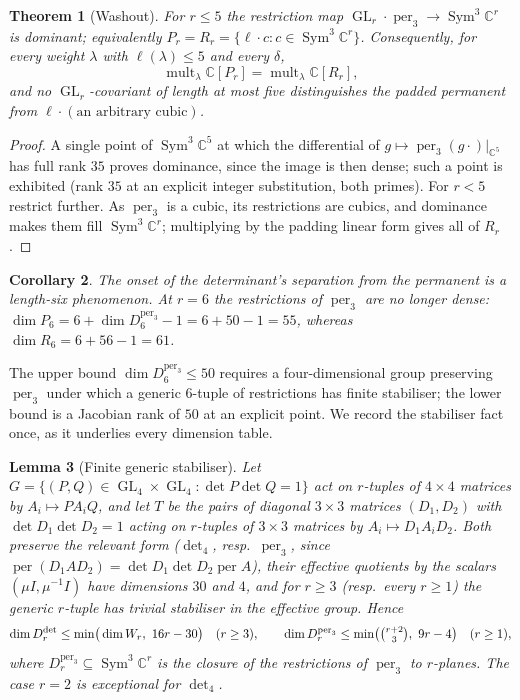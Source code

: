 \documentclass[11pt]{amsart}
\theoremstyle{plain}
\newtheorem{theorem}{Theorem}[section]
\newtheorem{lemma}[theorem]{Lemma}
\newtheorem{corollary}[theorem]{Corollary}
\theoremstyle{definition}
\theoremstyle{remark}
\DeclareMathOperator{\GL}{GL}
\DeclareMathOperator{\Sym}{Sym}
\DeclareMathOperator{\mult}{mult}
\DeclareMathOperator{\per}{per}
\newcommand{\bC}{\mathbb{C}}
\newcommand{\Rr}{R}
\newcommand{\Pp}{P}
\newcommand{\Ddet}{D^{\det}}
\begin{document}
\begin{theorem}[Washout]\label{thm:washout}
For $r\le5$ the restriction map $\GL_r\cdot\per_3\to\Sym^{3}\bC^{r}$ is
dominant; equivalently $\Pp_r=\Rr_r=\{\ell\cdot c:c\in\Sym^{3}\bC^{r}\}$.
Consequently, for every weight $\lambda$ with $\ell(\lambda)\le5$ and every
$\delta$,
\[
  \mult_\lambda\bC[\Pp_r]=\mult_\lambda\bC[\Rr_r],
\]
and no $\GL_r$-covariant of length at most five distinguishes the padded
permanent from $\ell\cdot(\text{an arbitrary cubic})$.
\end{theorem}

\begin{proof}
A single point of $\Sym^{3}\bC^{5}$ at which the differential of
$g\mapsto\per_3(g\cdot)|_{\bC^{5}}$ has full rank $35$ proves dominance, since
the image is then dense; such a point is exhibited (rank $35$ at an explicit
integer substitution, both primes).  For $r<5$ restrict further.  As
$\per_3$ is a cubic, its restrictions are cubics, and dominance makes them fill
$\Sym^{3}\bC^{r}$; multiplying by the padding linear form gives all of
$\Rr_r$.
\end{proof}

\begin{corollary}\label{cor:washout}
The onset of the determinant's separation from the permanent is a
\emph{length-six} phenomenon.  At $r=6$ the restrictions of $\per_3$ are no
longer dense: $\dim\Pp_6=6+\dim D^{\per_3}_6-1=6+50-1=55$, whereas
$\dim\Rr_6=6+56-1=61$.
\end{corollary}

The upper bound $\dim D^{\per_3}_6\le50$ requires a four-dimensional group
preserving $\per_3$ under which a generic $6$-tuple of restrictions has finite
stabiliser; the lower bound is a Jacobian rank of $50$ at an explicit point.
We record the stabiliser fact once, as it underlies every dimension table.

\begin{lemma}[Finite generic stabiliser]\label{lem:finstab}
Let $G=\{(P,Q)\in\GL_4\times\GL_4:\det P\det Q=1\}$ act on $r$-tuples of
$4\times4$ matrices by $A_i\mapsto PA_iQ$, and let $T$ be the pairs of diagonal
$3\times3$ matrices $(D_1,D_2)$ with $\det D_1\det D_2=1$ acting on $r$-tuples
of $3\times3$ matrices by $A_i\mapsto D_1A_iD_2$.  Both preserve the relevant form
($\det_4$, resp.\ $\per_3$, since $\per(D_1AD_2)=\det D_1\det D_2\per A$),
their effective quotients by the scalars $(\mu I,\mu^{-1}I)$ have dimensions
$30$ and $4$, and for $r\ge3$ (resp.\ every $r\ge1$) the generic $r$-tuple has
trivial stabiliser in the effective group.  Hence
\[
  \dim\Ddet_r\le\min\!\big(\dim W_r,\ 16r-30\big)\quad(r\ge3),\qquad
  \dim D^{\per_3}_r\le\min\!\big(\tbinom{r+2}{3},\ 9r-4\big)\quad(r\ge1),
\]
where $D^{\per_3}_r\subseteq\Sym^{3}\bC^{r}$ is the closure of the restrictions
of $\per_3$ to $r$-planes.  The case $r=2$ is exceptional for $\det_4$.
\end{lemma}
\end{document}
